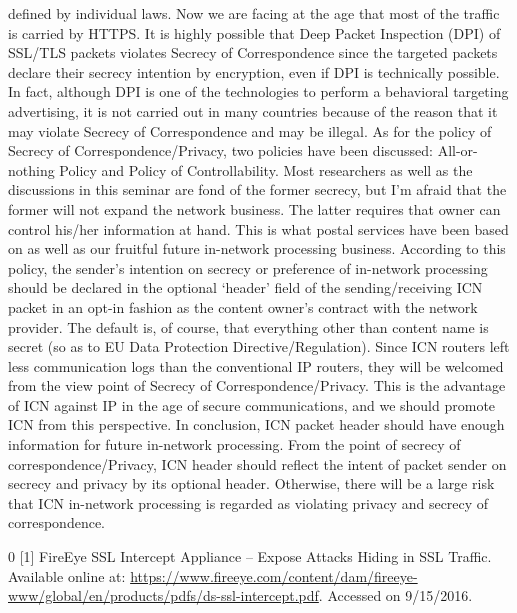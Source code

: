 \documentclass[a4paper,UKenglish]{dagrep}
\begin{document}
defined by individual laws.
Now we are facing at the age that most of the traffic is carried by
HTTPS. It is highly possible that Deep Packet Inspection (DPI) of
SSL/TLS packets violates Secrecy of Correspondence since the targeted
packets declare their secrecy intention by encryption, even if DPI
is technically possible. In fact, although DPI is one of the
technologies to perform a behavioral targeting advertising, it is not
carried out in many countries because of the reason that it may violate
Secrecy of Correspondence and may be illegal.
As for the policy of Secrecy of Correspondence/Privacy, two policies
have been discussed: All-or-nothing Policy and Policy of Controllability.
Most researchers as well as the discussions in this seminar are fond
of the former secrecy, but I’m afraid that the former will not expand
the network business. The latter requires that owner can control his/her
information at hand. This is what postal services have been based on as
well as our fruitful future in-network processing business. According to
this policy, the sender’s intention on secrecy or preference of
in-network processing should be declared in the optional ‘header’ field
of the sending/receiving ICN packet in an opt-in fashion as the content
owner’s contract with the network provider. The default is, of course,
that everything other than content name is secret (so as to EU Data
Protection Directive/Regulation). Since ICN routers left less
communication logs than the conventional IP routers, they will be
welcomed from the view point of Secrecy of Correspondence/Privacy. This
is the advantage of ICN against IP in the age of secure communications,
and we should promote ICN from this perspective.
In conclusion, ICN packet header should have enough information for
future in-network processing. From the point of secrecy of
correspondence/Privacy, ICN header should reflect the intent of
packet sender on secrecy and privacy by its optional header. Otherwise,
there will be a large risk that ICN in-network processing is regarded as
violating privacy and secrecy of correspondence.

\begin{thebibliography}{0}
[1] FireEye SSL Intercept Appliance -- Expose Attacks Hiding in SSL Traffic. Available online at: \url{https://www.fireeye.com/content/dam/fireeye-www/global/en/products/pdfs/ds-ssl-intercept.pdf}. Accessed on 9/15/2016.
\end{thebibliography}

%
\end{document}
